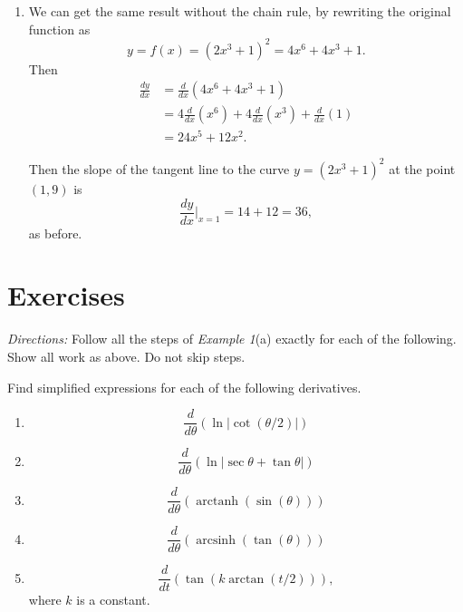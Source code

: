 \documentclass{ximera}
\newcommand{\pskip}{\vskip 0.1 in}
\begin{document}
\begin{example}
\begin{explanation}
\begin{enumerate}
\pskip 

\item We can get the same result without the chain rule, by rewriting the original function as
\[
     y = f(x) = (2x^3+1)^2 = 4x^6 + 4x^3 + 1.
\] 
Then
\begin{align*}
      \frac{dy}{dx} &= \frac{d}{dx} \left(  4x^6 + 4x^3 + 1  \right) \\
                         &= 4\frac{d}{dx}\left( x^6 \right) + 4 \frac{d}{dx}\left( x^3 \right) + \frac{d}{dx}\left(1 \right) \\
                        &=   24x^5 + 12x^2 .
\end{align*}

Then the slope of the tangent line to the curve $y=(2x^3+1)^2$ at the point $(1,9)$ is 
\[
              \frac{dy}{dx}\Big|_{x=1} =14 + 12 = 36 ,
\]
as before.

\end{enumerate}

\end{explanation}
\end{example}


\section{Exercises}

\emph{Directions:} Follow all the steps of \emph{Example 1}(a) exactly for each of the following. Show all work as above. Do not skip steps.

\begin{exercise}  \label{Q9edRersfrre}
Find simplified expressions for each of the following derivatives.

\begin{enumerate}

\item
\[
\frac{d}{d\theta}\left( \ln \left| \cot (\theta/2)\right| \right)
\]

\item 
\[
\frac{d}{d\theta}\left( \ln \left| \sec\theta + \tan\theta \right| \right)
\]

\item 
\[
\frac{d}{d\theta}\left( \operatorname{arctanh}(\sin(\theta)) \right)
\]

\item 
\[
\frac{d}{d\theta}\left( \operatorname{arcsinh}(\tan(\theta)) \right)
\]

\item 
\[
\frac{d}{dt} \left(   \tan \left( k \arctan(t/2)  \right)       \right),
\]
where $k$ is a constant.
\end{enumerate}

\end{exercise}
\end{document}
